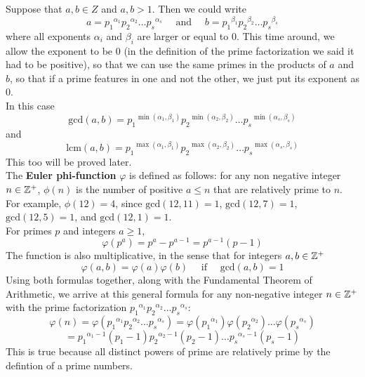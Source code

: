 \documentclass[12pt]{article}
\begin{document}
    Suppose that $a, b \in Z$ and $a, b > 1$.
    Then we could write
    \[ a = {p_1}^{\alpha_1}{p_2}^{\alpha_2} \dots {p_s}^{\alpha_s}
    \quad \text{ and } \quad
    b = {p_1}^{\beta_1}{p_2}^{\beta_2} \dots {p_s}^{\beta_s} \]
    where all exponents $\alpha_i$ and $\beta_i$
    are larger or equal to $0$.
    This time around, we allow the exponent to be $0$
    (in the definition of the prime factorization
    we said it had to be positive),
    so that we can use the same primes in the products of $a$ and $b$,
    so that if a prime features in one and not the other,
    we just put its exponent as $0$. \\
    In this case
    \[ \text{gcd}(a, b) = 
    {p_1}^{\min(\alpha_1, \beta_1)}
    {p_2}^{\min(\alpha_2, \beta_2)} \dots
    {p_s}^{\min(\alpha_s, \beta_s)} \]
    and 
    \[ \text{lcm}(a, b) = 
    {p_1}^{\max(\alpha_1, \beta_1)}
    {p_2}^{\max(\alpha_2, \beta_2)} \dots
    {p_s}^{\max(\alpha_s, \beta_s)} \]
    This too will be proved later. \\

    The \textbf{Euler phi-function} $\varphi$ is defined as follows:
    for any non negative integer $n \in \mathbb{Z}^+$,
    $\phi(n)$ is the number of positive $a \leqslant n$
    that are relatively prime to $n$.
    For example, $\phi(12) = 4$,
    since $\text{gcd}(12, 11) = 1$,
    $\text{gcd}(12, 7) = 1$,
    $\text{gcd}(12, 5) = 1$,
    and $\text{gcd}(12, 1) = 1$. \\
    For primes $p$ and integers $a \geqslant 1$,
    \[ \varphi(p^a) = p^{a} - p^{a-1} = p^{a-1}(p - 1) \]
    The function is also multiplicative,
    in the sense that for integers $a, b \in \mathbb{Z}^+$
    \[ \varphi(a, b) = \varphi(a)\varphi(b)
    \quad \text{ if } \quad \text{gcd}(a, b) = 1 \]
    Using both formulas together,
    along with the Fundamental Theorem of Arithmetic,
    we arrive at this general formula
    for any non-negative integer $n \in \mathbb{Z}^+$
    with the prime factorization
    ${p_1}^{\alpha_1}{p_2}^{\alpha_2} \dots {p_s}^{\alpha_s}$:
    \[ \varphi(n) = 
    \varphi({p_1}^{\alpha_1}{p_2}^{\alpha_2} \dots {p_s}^{\alpha_s}) =
    \varphi({p_1}^{\alpha_1})\varphi({p_2}^{\alpha_2}) \dots 
    \varphi({p_s}^{\alpha_s})\]
    \[ = {p_1}^{\alpha_1 - 1}(p_1 - 1){p_2}^{\alpha_2 - 1}(p_2 - 1)
    \dots {p_s}^{\alpha_s - 1}(p_s - 1) \]
    This is true because all distinct powers of prime are relatively prime
    by the defintion of a prime numbers. \\
\end{document}
